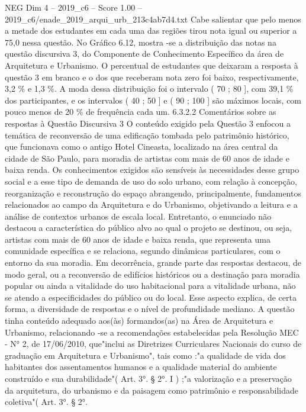 \begin{textsample}{NEG Dim 4 – 2019\_c6 – Score 1.00 – 2019\_c6/enade\_2019\_arqui\_urb\_213c4ab7d4.txt}
Cabe salientar que pelo menos a metade dos estudantes em cada uma das regiões tirou nota igual ou superior a 75,0 nessa questão.
No Gráfico 6.12, mostra -se a distribuição das notas na questão discursiva 3, do Componente de Conhecimento Específico da área de Arquitetura e Urbanismo.
O percentual de estudantes que deixaram a resposta à questão 3 em branco e o dos que receberam nota zero foi baixo, respectivamente, 3,2 \% e 1,3 \%.
A moda dessa distribuição foi o intervalo ( 70 ; 80 ], com 39,1 \% dos participantes, e os intervalos ( 40 ; 50 ] e ( 90 ; 100 ] são máximos locais, com pouco menos de 20 \% de frequência cada um. 6.3.2.2 Comentários sobre as respostas à Questão Discursiva 3 O conteúdo exigido pela Questão 3 enfocou a temática de reconversão de uma edificação tombada pelo patrimônio histórico, que funcionava como o antigo Hotel Cineasta, localizado na área central da cidade de São Paulo, para moradia de artistas com mais de 60 anos de idade e baixa renda.
Os conhecimentos exigidos são sensíveis às necessidades desse grupo social e a esse tipo de demanda de uso do solo urbano, com relação à concepção, reorganização e reconstrução do espaço abrangendo, principalmente, fundamentos relacionados ao campo da Arquitetura e do Urbanismo, objetivando a leitura e a análise de contextos urbanos de escala local.
Entretanto, o enunciado não destacou a característica do público alvo ao qual o projeto se destinou, ou seja, artistas com mais de 60 anos de idade e baixa renda, que representa uma comunidade específica e se relaciona, segundo dinâmicas particulares, com o entorno da sua moradia.
Em decorrência, grande parte das respostas destacou, de modo geral, ou a reconversão de edifícios históricos ou a destinação para moradia popular ou ainda a vitalidade do uso habitacional para a vitalidade urbana, não se atendo a especificidades do público ou do local.
Esse aspecto explica, de certa forma, a diversidade de respostas e o nível de profundidade mediano.
A questão tinha conteúdo adequado aos(às) formandos(as) na Área de Arquitetura e Urbanismo, relacionando -se a recomendações estabelecidas pela Resolução MEC - N{\EmojiFont °} 2, de 17/06/2010, que"inclui as Diretrizes Curriculares Nacionais do curso de graduação em Arquitetura e Urbanismo", tais como :"a qualidade de vida dos habitantes dos assentamentos humanos e a qualidade material do ambiente construído e sua durabilidade"( Art. 3{\EmojiFont °}. § 2{\EmojiFont °}.
I ) ;"a valorização e a preservação da arquitetura, do urbanismo e da paisagem como patrimônio e responsabilidade coletiva"( Art. 3{\EmojiFont °}. § 2{\EmojiFont °}.

\end{textsample}
